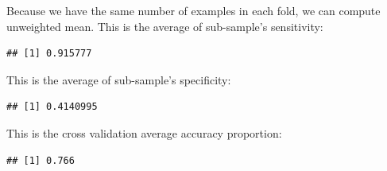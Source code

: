 \documentclass{article}\usepackage[]{graphicx}\usepackage[]{color}
\makeatletter
\newenvironment{kframe}{%
 \def\at@end@of@kframe{}%
 \ifinner\ifhmode%
  \def\at@end@of@kframe{\end{minipage}}%
  \begin{minipage}{\columnwidth}%
 \fi\fi%
 \def\FrameCommand##1{\hskip\@totalleftmargin \hskip-\fboxsep
 \colorbox{shadecolor}{##1}\hskip-\fboxsep
     \hskip-\linewidth \hskip-\@totalleftmargin \hskip\columnwidth}%
 \MakeFramed {\advance\hsize-\width
   \@totalleftmargin\z@ \linewidth\hsize
   \@setminipage}}%
 {\par\unskip\endMakeFramed%
 \at@end@of@kframe}
\newenvironment{knitrout}{}{} %
\makeatother
\begin{document}
Because we have the same number of examples in each fold, we can compute unweighted mean. This is the average of sub-sample's sensitivity:
\begin{knitrout}
\color{fgcolor}\begin{kframe}
\begin{verbatim}
## [1] 0.915777
\end{verbatim}
\end{kframe}
\end{knitrout}
This is the average of sub-sample's specificity:
\begin{knitrout}
\color{fgcolor}\begin{kframe}
\begin{verbatim}
## [1] 0.4140995
\end{verbatim}
\end{kframe}
\end{knitrout}
This is the cross validation average accuracy proportion:
\begin{knitrout}
\color{fgcolor}\begin{kframe}
\begin{verbatim}
## [1] 0.766
\end{verbatim}
\end{kframe}
\end{knitrout}
\end{document}
